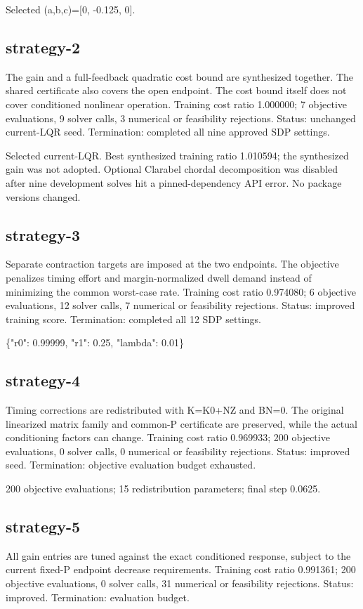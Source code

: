 \documentclass[11pt,a4paper]{article}
\begin{document}
Selected (a,b,c)=[0, -0.125, 0].

\subsection*{strategy-2}
The gain and a full-feedback quadratic cost bound are synthesized together. The shared certificate also covers the open endpoint. The cost bound itself does not cover conditioned nonlinear operation. Training cost ratio 1.000000; 7 objective evaluations, 9 solver calls, 3 numerical or feasibility rejections. Status: unchanged current-LQR seed. Termination: completed all nine approved SDP settings.

Selected current-LQR. Best synthesized training ratio 1.010594; the synthesized gain was not adopted. Optional Clarabel chordal decomposition was disabled after nine development solves hit a pinned-dependency API error. No package versions changed.

\subsection*{strategy-3}
Separate contraction targets are imposed at the two endpoints. The objective penalizes timing effort and margin-normalized dwell demand instead of minimizing the common worst-case rate. Training cost ratio 0.974080; 6 objective evaluations, 12 solver calls, 7 numerical or feasibility rejections. Status: improved training score. Termination: completed all 12 SDP settings.

\{"r0": 0.99999, "r1": 0.25, "lambda": 0.01\}

\subsection*{strategy-4}
Timing corrections are redistributed with K=K0+NZ and BN=0. The original linearized matrix family and common-P certificate are preserved, while the actual conditioning factors can change. Training cost ratio 0.969933; 200 objective evaluations, 0 solver calls, 0 numerical or feasibility rejections. Status: improved seed. Termination: objective evaluation budget exhausted.

200 objective evaluations; 15 redistribution parameters; final step 0.0625.

\subsection*{strategy-5}
All gain entries are tuned against the exact conditioned response, subject to the current fixed-P endpoint decrease requirements. Training cost ratio 0.991361; 200 objective evaluations, 0 solver calls, 31 numerical or feasibility rejections. Status: improved. Termination: evaluation budget.
\end{document}
